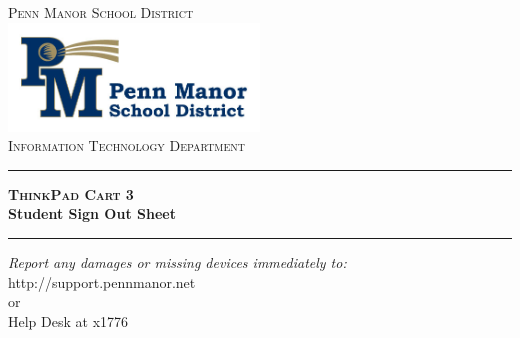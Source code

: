 \begin{titlepage}

\begin{center}

\textsc{\LARGE Penn Manor School District}\\[1.5cm]


\includegraphics[width=0.5\textwidth]{images/logo}\\[1cm]


\textsc{\Large Information Technology Department}\\[0.5cm]


\hrule
{\huge \bfseries \textsc{ThinkPad Cart} 3\\ \vspace{0.5cm} Student Sign Out Sheet}\\[0.4cm]

\hrule


\vfill
\begin{center} \large
\emph{Report any damages or missing devices immediately to:}\\
http://support.pennmanor.net \\or\\Help Desk at x1776
\end{center}


\vfill

\end{center}

\end{titlepage}
